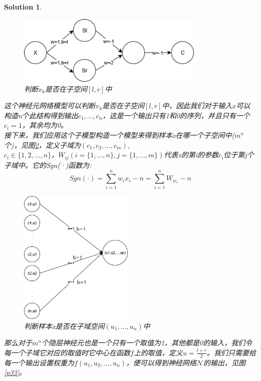 \documentclass[a4paper,UTF8]{article}
\numberwithin{equation}{section}
\newtheorem*{solution}{Solution}
\begin{document}
\begin{solution}
\begin{enumerate}[ {(}1{)}]
		 \begin{figure}[!h]
		 	\centering   
		 	\includegraphics[width=0.8\textwidth, height=0.3\textwidth]{p31.png}  
		 	\caption{判断$x_k$是否在子空间$[l,r]$中} 
		 	\label{p31}
		 \end{figure}
	 	这个神经元网络模型可以判断$x_k$是否在子空间$[l,r]$中，因此我们对于输入$x$可以构造n个此结构得到输出$c_1,...,c_n$，这是一个输出只有1和0的序列，并且只有一个$c_i=1$，其余均为0。\\
	 	接下来，我们应用这个子模型构造一个模型来得到样本x在哪一个子空间中($m^n$个)，见图\ref{p32}，定义子域为$(c_1,c_2,...,c_m)$,\\
	 	$c_i \in \{1,2,...,n\}$，$W_{ij}(i=\{1,...,n\},j=\{1,...,m\})$代表x的第i的参数$c_i$位于第j个子域中。它的Sgn(·)函数为:
	 	$$Sgn(\cdot) = \sum_{i=1}^n{w_ix_i}-n=\sum_{i=1}^n{W_{ic_i}}-n$$
	 	
	 	\begin{figure}[!h]
	 		\centering   
	 		\includegraphics[width=0.5\textwidth, height=0.5\textwidth]{p32.png}  
	 		\caption{判断样本x是否在子域空间$(u_1,...,u_n)$中} 
	 		\label{p32}
	 	\end{figure}
	 	
	 	
	 	那么对于$m^n$个隐层神经元也是一个只有一个取值为1，其他都是0的输入，我们令每一个子域它对应的取值时它中心在函数$f$上的取值，定义$u = \frac{l+r}{2}$。我们只需要给每一个输出设置权重为$f(u_1,u_2,...,u_n)$，便可以得到神经网络$\mathcal{N}$的输出，见图\ref{p33}。
	 	

\end{enumerate}
\end{solution}
\end{document}
